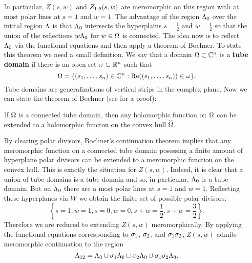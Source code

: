 \documentclass[12pt,reqno,oneside]{amsart}
\begin{document}
    In particular, $Z(s,w)$ and $Z_{1,\theta}(s,w)$ are meromorphic on this region with at most polar lines at $s = 1$ and $w = 1$. The advantage of the region $\Lambda_{0}$ over the intital region $\Lambda$ is that $\Lambda_{0}$ intersects the hyperplains $s = \frac{1}{2}$ and $w = \frac{1}{2}$ so that the union of the reflections $w\Lambda_{0}$ for $w \in \Omega$ is connected. The idea now is to reflect $\Lambda_{0}$ via the functional equations and then apply a theorem of Bochner. To state this theorem we need a small definition. We say that a domain $\Omega \subset \mathbb{C}^{n}$ is a \textbf{tube domain} if there is an open set $\omega \subset \mathbb{R}^{n}$ such that
    \[
        \Omega = \{(s_{1},\ldots,s_{n}) \in \mathbb{C}^{n}:\mathrm{Re}((s_{1},\ldots,s_{n})) \in \omega\}.
    \]
    Tube domains are generalizations of vertical strips in the complex plane. Now we can state the theorem of Bochner (see \cite{H} for a proof):

    \begin{theorem}
        If $\Omega$ is a connected tube domain, then any holomorphic function on $\Omega$ can be extended to a holomorphic functon on the convex hull $\widehat{\Omega}$.
    \end{theorem}

    By clearing polar divisors, Bochner's continuation theorem implies that any meromorphic function on a connected tube domain posessing a finite amount of hyperplane polar divisors can be extended to a meromorphic function on the convex hull. This is exactly the situation for $Z(s,w)$. Indeed, it is clear that a union of tube domains is a tube domain and so, in particular, $\Lambda_{0}$ is a tube domain. But on $\Lambda_{0}$ there are a most polar lines at $s = 1$ and $w = 1$. Reflecting these hyperplanes via $W$ we obtain the finite set of possible polar divisors:
    \[
        \left\{s = 1, w = 1, s = 0, w = 0, s+w = \frac{1}{2}, s+w = \frac{3}{2}\right\}.
    \]
    Therefore we are reduced to extending $Z(s,w)$ meromorphically. By applying the functional equations corresponding to $\sigma_{1}$, $\sigma_{2}$, and $\sigma_{1}\sigma_{2}$, $Z(s,w)$ admits meromorphic continuation to the region
    \[
        \Lambda_{12} = \Lambda_{0} \cup \sigma_{1}\Lambda_{0} \cup \sigma_{2}\Lambda_{0} \cup \sigma_{1}\sigma_{2}\Lambda_{0}.
    \]
\end{document}
